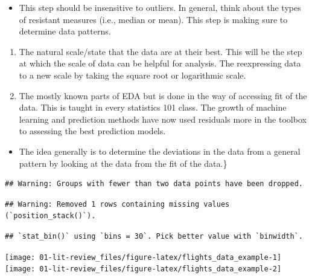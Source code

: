 \documentclass[
]{article}
\providecommand{\tightlist}{%
  \setlength{\itemsep}{0pt}\setlength{\parskip}{0pt}}
\begin{document}
\begin{itemize}
\tightlist
\item
  This step should be insensitive to outliers. In general, think about
  the types of resistant measures (i.e., median or mean). This step is
  making sure to determine data patterns.
\end{itemize}

\begin{enumerate}
\def\labelenumi{\arabic{enumi}.}
\setcounter{enumi}{2}
\item
  The natural scale/state that the data are at their best. This will be
  the step at which the scale of data can be helpful for analysis. The
  reexpressing data to a new scale by taking the square root or
  logarithmic scale.
\item
  The mostly known parts of EDA but is done in the way of accessing fit
  of the data. This is taught in every statistics 101 class. The growth
  of machine learning and prediction methods have now used residuals
  more in the toolbox to assessing the best prediction models.
\end{enumerate}

\begin{itemize}
\tightlist
\item
  The idea generally is to determine the deviations in the data from a
  general pattern by looking at the data from the fit of the data.\}
\end{itemize}

\begin{verbatim}
## Warning: Groups with fewer than two data points have been dropped.
\end{verbatim}

\begin{verbatim}
## Warning: Removed 1 rows containing missing values (`position_stack()`).
\end{verbatim}

\begin{verbatim}
## `stat_bin()` using `bins = 30`. Pick better value with `binwidth`.
\end{verbatim}

\begin{center}\texttt{[image: 01-lit-review\_files/figure-latex/flights\_data\_example-1]} \texttt{[image: 01-lit-review\_files/figure-latex/flights\_data\_example-2]} \end{center}

\end{document}
